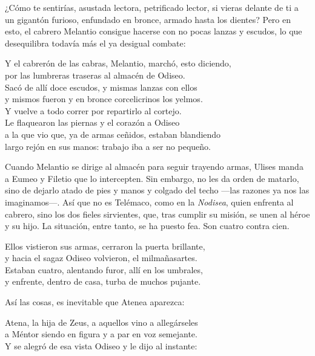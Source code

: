 ¿Cómo te sentirías, asustada lectora, petrificado lector, si vieras delante de ti a un gigantón furioso, enfundado en bronce, armado hasta los dientes? Pero en esto, el cabrero Melantio consigue hacerse con no pocas lanzas y escudos, lo que desequilibra todavía más el ya desigual combate:

\begin{versocita}
Y el cabrerón de las cabras, Melantio, marchó, esto diciendo,\\
por las lumbreras traseras al almacén de Odiseo.\\
Sacó de allí doce escudos, y mismas lanzas con ellos\\
y mismos fueron y en bronce corcelicrinos los yelmos.\\
Y vuelve a todo correr por repartirlo al cortejo.\\
Le flaquearon las piernas y el corazón a Odiseo\\
a la que vio que, ya de armas ceñidos, estaban blandiendo\\
largo rejón en sus manos: trabajo iba a ser no pequeño.
\end{versocita}

Cuando Melantio se dirige al almacén para seguir trayendo armas, Ulises manda a Eumeo y Filetio que lo intercepten. Sin embargo, no les da orden de matarlo, sino de dejarlo atado de pies y manos y colgado del techo ---las razones ya nos las imaginamos---. Así que no es Telémaco, como en la \emph{Nodisea}, quien enfrenta al cabrero, sino los dos fieles sirvientes, que, tras cumplir su misión, se unen al héroe y su hijo. La situación, entre tanto, se ha puesto fea. Son cuatro contra cien.

\begin{versocita}
Ellos vistieron sus armas, cerraron la puerta brillante,\\
y hacia el sagaz Odiseo volvieron, el milmañasartes.\\
Estaban cuatro, alentando furor, allí en los umbrales,\\
y enfrente, dentro de casa, turba de muchos pujante.
\end{versocita}

Así las cosas, es inevitable que Atenea aparezca:

\begin{versocita}
Atena, la hija de Zeus, a aquellos vino a allegárseles\\
a Méntor siendo en figura y a par en voz semejante.\\
Y se alegró de esa vista Odiseo y le dijo al instante:
\end{versocita}


